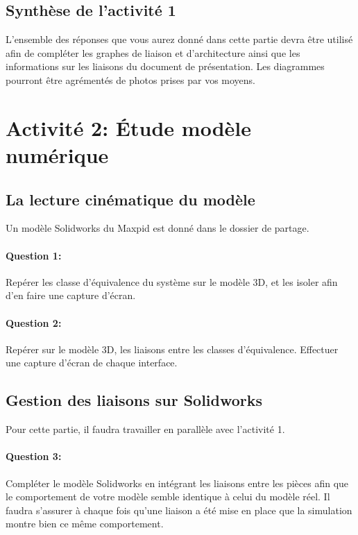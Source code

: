 \subsection{Synthèse de l'activité 1}

L'ensemble des réponses que vous aurez donné dans cette partie devra être utilisé afin de compléter les graphes de liaison et d'architecture ainsi que les informations sur les liaisons du document de présentation. Les diagrammes pourront être agrémentés de photos prises par vos moyens.

\section{Activité 2: Étude modèle numérique}

\subsection{La lecture cinématique du modèle}

Un modèle Solidworks du Maxpid est donné dans le dossier de partage.

\paragraph{Question 1:} Repérer les classe d'équivalence du système sur le modèle 3D, et les isoler afin d'en faire une capture d'écran.

\paragraph{Question 2:} Repérer sur le modèle 3D, les liaisons entre les classes d'équivalence. Effectuer une capture d'écran de chaque interface.

\subsection{Gestion des liaisons sur Solidworks}

Pour cette partie, il faudra travailler en parallèle avec l'activité 1.

\paragraph{Question 3:} Compléter le modèle Solidworks en intégrant les liaisons entre les pièces afin que le comportement de votre modèle semble identique à celui du modèle réel. Il faudra s'assurer à chaque fois qu'une liaison a été mise en place que la simulation montre bien ce même comportement.


